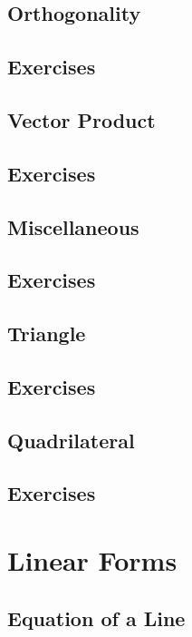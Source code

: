 \documentclass[11pt]{book}
\begin{document}
\section{Orthogonality}

\section{Exercises}

\section{Vector Product}

\section{Exercises}

\section{Miscellaneous}

\section{Exercises}

\section{Triangle}

\section{Exercises}

\section{ Quadrilateral}

\section{Exercises}

%
\chapter{Linear Forms}
\section{Equation of a Line}

\end{document}
